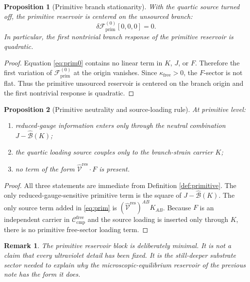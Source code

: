 \documentclass[11pt]{article}
\newcommand{\ResidualLift}{\widehat{\mathcal V}^{\mathrm{res}}}
\newcommand{\SubGaugeVec}{\widehat{\mathcal B}}
\newcommand{\CompFree}{\mathscr C_{\mathrm{cmp}}^{\mathrm{free}}}
\newcommand{\PrimFunctional}{\mathscr F_{\mathrm{prim}}}
\newcommand{\FreeStiff}{\kappa_{\mathrm{free}}}
\newcommand{\PrimStrain}{K}
\newcommand{\PrimNeutral}{J}
\newcommand{\PrimFree}{F}
\newtheorem{proposition}{Proposition}
\newtheorem{remark}{Remark}
\begin{document}
\begin{proposition}[Primitive branch stationarity]
\label{prop:branchstationary}
With the quartic source turned off, the primitive reservoir is centered on the unsourced branch:
\begin{equation}
\delta \PrimFunctional^{(0)}[0,0,0]=0.
\label{eq:branchstationary}
\end{equation}
In particular, the first nontrivial branch response of the primitive reservoir is quadratic.
\end{proposition}

\begin{proof}
Equation \eqref{eq:prim0} contains no linear term in \(\PrimStrain\), \(\PrimNeutral\), or \(\PrimFree\). Therefore the first variation of \(\PrimFunctional^{(0)}\) at the origin vanishes. Since \(\FreeStiff>0\), the \(\PrimFree\)-sector is not flat. Thus the primitive unsourced reservoir is centered on the branch origin and the first nontrivial response is quadratic.
\end{proof}

\begin{proposition}[Primitive neutrality and source-loading rule]
\label{prop:neutralprimitive}
At primitive level:
\begin{enumerate}
    \item reduced-gauge information enters only through the neutral combination \(\PrimNeutral-\SubGaugeVec(\PrimStrain)\);
    \item the quartic loading source couples only to the branch-strain carrier \(\PrimStrain\);
    \item no term of the form \(\ResidualLift\cdot\PrimFree\) is present.
\end{enumerate}
\end{proposition}

\begin{proof}
All three statements are immediate from Definition \ref{def:primitive}. The only reduced-gauge-sensitive primitive term is the square of \(\PrimNeutral-\SubGaugeVec(\PrimStrain)\). The only source term added in \eqref{eq:prim} is \((\ResidualLift)^{AB}\PrimStrain_{AB}\). Because \(\PrimFree\) is an independent carrier in \(\CompFree\) and the source loading is inserted only through \(\PrimStrain\), there is no primitive free-sector loading term.
\end{proof}

\begin{remark}
The primitive reservoir block is deliberately minimal. It is not a claim that every ultraviolet detail has been fixed. It is the still-deeper substrate sector needed to explain why the microscopic-equilibrium reservoir of the previous note has the form it does.
\end{remark}
\end{document}
